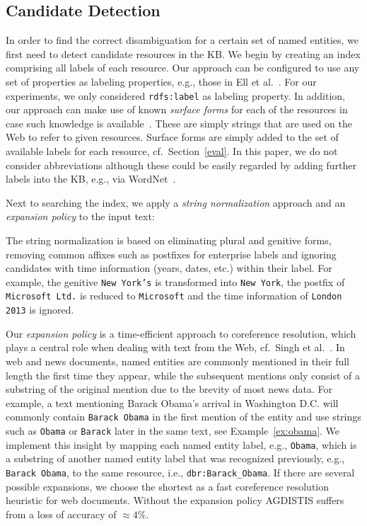 \subsection{Candidate Detection}\label{choosing}

In order to find the correct disambiguation for a certain set of named entities, we first need to detect candidate resources in the \ac{KB}. 
We begin by creating an index comprising all labels of each resource.
Our approach can be configured to use any set of properties as labeling properties, e.g., those in Ell et al.~\cite{ELL+11}. 
For our experiments, we only considered \texttt{rdfs:label} as labeling property.
In addition, our approach can make use of known \emph{surface forms} for each of the resources in case such knowledge is available~\cite{spotlight}.
These are simply strings that are used on the Web to refer to given resources.
Surface forms are simply added to the set of available labels for each resource, cf.\ Section~\ref{eval}.
In this paper, we do not consider abbreviations although these could be easily regarded by adding further labels into the \ac{KB}, e.g., via WordNet~\cite{wordnet}.

Next to searching the index, we apply a \emph{string normalization} approach and an \emph{expansion policy} to the input text:

The string normalization is based on eliminating plural and genitive forms, removing common affixes such as postfixes for enterprise labels and ignoring candidates with time information (years, dates, etc.) within their label.
For example, the genitive \texttt{New York's} is transformed into \texttt{New York}, the postfix of \texttt{Microsoft Ltd.} is reduced to \texttt{Microsoft} and the time information of \texttt{London 2013} is ignored.

Our \emph{expansion policy} is a time-efficient approach to coreference resolution, which plays a central role when dealing with text from the Web, cf.~Singh et al.~\cite{singh}. 
In web and news documents, named entities are commonly mentioned in their full length the first time they appear, while the subsequent mentions only consist of a substring of the original mention due to the brevity of most news data.
For example, a text mentioning Barack Obama's arrival in Washington D.C. will commonly contain \texttt{Barack Obama} in the first mention of the entity and use strings such as \texttt{Obama} or \texttt{Barack} later in the same text, see Example~\ref{ex:obama}.
We implement this insight by mapping each named entity label, e.g., \texttt{Obama}, which is a substring of another named entity label that was recognized previously, e.g., \texttt{Barack Obama}, to the same resource, i.e., \texttt{dbr:Barack\_Obama}.
If there are several possible expansions, we choose the shortest as a fast coreference resolution heuristic for web documents.
Without the expansion policy AGDISTIS suffers from a loss of accuracy of $\approx4\%$.




